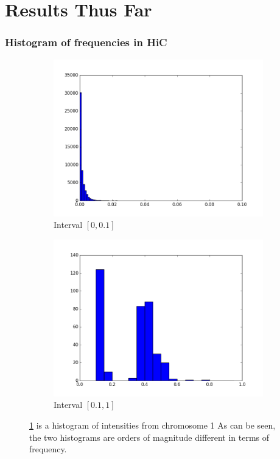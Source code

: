 \documentclass{beamer}
\begin{document}
\section{Results Thus Far}
\begin{frame}
    \frametitle{Histogram of frequencies in HiC}
    \begin{figure}[H]
        \centering
        \begin{subfigure}[b]{.45\textwidth} 
            \includegraphics[width=\textwidth]{figures/hist01.png}
            \caption{Interval $[0, 0.1]$}
            \label{fig:hist01}
        \end{subfigure}
        \begin{subfigure}[b]{.45\textwidth}
            \includegraphics[width=\textwidth]{figures/hist02.png}
            \caption{Interval $[0.1, 1]$}
            \label{fig:hist02}
        \end{subfigure}
        \caption{\ref{fig:hist01} is a histogram of intensities from
        chromosome 1 
        As can be seen, the two histograms are orders of magnitude
        different in terms of frequency.}
        \label{fig:hists}
    \end{figure}
\end{frame}
\end{document}
